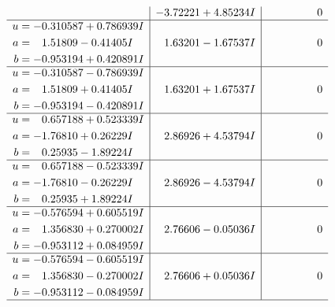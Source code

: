 \documentclass[1p]{elsarticle_modified}
\theoremstyle{definition}
\begin{document}
$$\begin{array}{c|c|c}
 & -3.72221 + 4.85234 I & \phantom{-0.000000 } 0 \\ \hline\begin{aligned}
u &= -0.310587 + 0.786939 I \\
a &= \phantom{-}1.51809 - 0.41405 I \\
b &= -0.953194 + 0.420891 I\end{aligned}
 & \phantom{-}1.63201 - 1.67537 I & \phantom{-0.000000 } 0 \\ \hline\begin{aligned}
u &= -0.310587 - 0.786939 I \\
a &= \phantom{-}1.51809 + 0.41405 I \\
b &= -0.953194 - 0.420891 I\end{aligned}
 & \phantom{-}1.63201 + 1.67537 I & \phantom{-0.000000 } 0 \\ \hline\begin{aligned}
u &= \phantom{-}0.657188 + 0.523339 I \\
a &= -1.76810 + 0.26229 I \\
b &= \phantom{-}0.25935 - 1.89224 I\end{aligned}
 & \phantom{-}2.86926 + 4.53794 I & \phantom{-0.000000 } 0 \\ \hline\begin{aligned}
u &= \phantom{-}0.657188 - 0.523339 I \\
a &= -1.76810 - 0.26229 I \\
b &= \phantom{-}0.25935 + 1.89224 I\end{aligned}
 & \phantom{-}2.86926 - 4.53794 I & \phantom{-0.000000 } 0 \\ \hline\begin{aligned}
u &= -0.576594 + 0.605519 I \\
a &= \phantom{-}1.356830 + 0.270002 I \\
b &= -0.953112 + 0.084959 I\end{aligned}
 & \phantom{-}2.76606 - 0.05036 I & \phantom{-0.000000 } 0 \\ \hline\begin{aligned}
u &= -0.576594 - 0.605519 I \\
a &= \phantom{-}1.356830 - 0.270002 I \\
b &= -0.953112 - 0.084959 I\end{aligned}
 & \phantom{-}2.76606 + 0.05036 I & \phantom{-0.000000 } 0\\
 \hline 
 \end{array}$$\newpage$$\begin{array}{c|c|c}  

\end{array}$$
\end{document}
